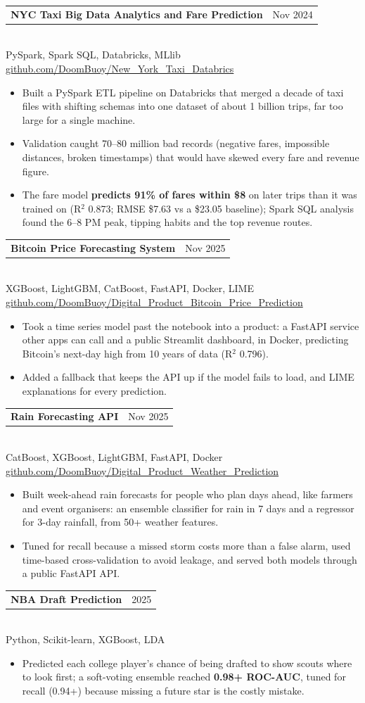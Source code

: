 \documentclass[letterpaper,11pt]{article}
\makeatletter
\newcommand{\resumeItem}[1]{\item\small{#1}}
\newcommand{\resumeProjectHeading}[3]{
  \vspace{-1pt}\item
    \begin{tabular*}{0.98\textwidth}[t]{l@{\extracolsep{\fill}}r}
      \small #1 & \small #2 \\
    \end{tabular*}\\[-1pt]
    {\footnotesize #3}\vspace{-6pt}
}
\newcommand{\resumeItemListStart}{\begin{itemize}}
\newcommand{\resumeItemListEnd}{\end{itemize}\vspace{-4pt}}
\newcommand{\plainlink}[1]{\href{https://#1}{#1}}
\makeatother
\begin{document}
\resumeProjectHeading
  {\textbf{NYC Taxi Big Data Analytics and Fare Prediction}}{Nov 2024}
  {PySpark, Spark SQL, Databricks, MLlib \textbar{} \plainlink{github.com/DoomBuoy/New\_York\_Taxi\_Databrics}}
  \resumeItemListStart
    \resumeItem{Built a PySpark ETL pipeline on Databricks that merged a decade of taxi files with shifting schemas into one dataset of about 1 billion trips, far too large for a single machine.}
    \resumeItem{Validation caught 70--80 million bad records (negative fares, impossible distances, broken timestamps) that would have skewed every fare and revenue figure.}
    \resumeItem{The fare model \textbf{predicts 91\% of fares within \$8} on later trips than it was trained on (R$^2$ 0.873; RMSE \$7.63 vs a \$23.05 baseline); Spark SQL analysis found the 6--8 PM peak, tipping habits and the top revenue routes.}
  \resumeItemListEnd

\resumeProjectHeading
  {\textbf{Bitcoin Price Forecasting System}}{Nov 2025}
  {XGBoost, LightGBM, CatBoost, FastAPI, Docker, LIME \textbar{} \plainlink{github.com/DoomBuoy/Digital\_Product\_Bitcoin\_Price\_Prediction}}
  \resumeItemListStart
    \resumeItem{Took a time series model past the notebook into a product: a FastAPI service other apps can call and a public Streamlit dashboard, in Docker, predicting Bitcoin's next-day high from 10 years of data (R$^2$ 0.796).}
    \resumeItem{Added a fallback that keeps the API up if the model fails to load, and LIME explanations for every prediction.}
  \resumeItemListEnd

\resumeProjectHeading
  {\textbf{Rain Forecasting API}}{Nov 2025}
  {CatBoost, XGBoost, LightGBM, FastAPI, Docker \textbar{} \plainlink{github.com/DoomBuoy/Digital\_Product\_Weather\_Prediction}}
  \resumeItemListStart
    \resumeItem{Built week-ahead rain forecasts for people who plan days ahead, like farmers and event organisers: an ensemble classifier for rain in 7 days and a regressor for 3-day rainfall, from 50+ weather features.}
    \resumeItem{Tuned for recall because a missed storm costs more than a false alarm, used time-based cross-validation to avoid leakage, and served both models through a public FastAPI API.}
  \resumeItemListEnd

\resumeProjectHeading
  {\textbf{NBA Draft Prediction}}{2025}
  {Python, Scikit-learn, XGBoost, LDA}
  \resumeItemListStart
    \resumeItem{Predicted each college player's chance of being drafted to show scouts where to look first; a soft-voting ensemble reached \textbf{0.98+ ROC-AUC}, tuned for recall (0.94+) because missing a future star is the costly mistake.}
  \resumeItemListEnd
\end{document}
